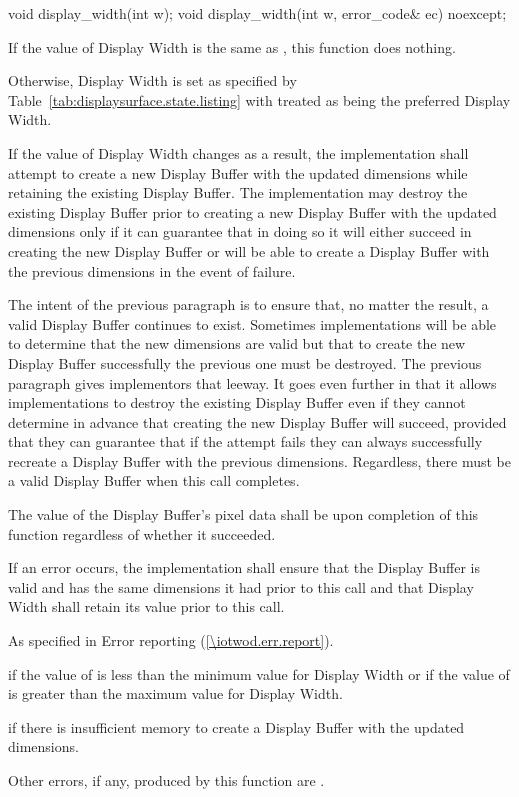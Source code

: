 \begin{itemdecl}
void display_width(int w);
void display_width(int w, error_code& ec) noexcept;
\end{itemdecl}
\begin{itemdescr}
\pnum
\effects
If the value of Display Width is the same as , this function does nothing.

\pnum
Otherwise, Display Width is set as specified by Table~\ref{tab:displaysurface.state.listing} with  treated as being the preferred Display Width.

\pnum
If the value of Display Width changes as a result, the implementation shall attempt to create a new Display Buffer with the updated dimensions while retaining the existing Display Buffer. The implementation may destroy the existing Display Buffer prior to creating a new Display Buffer with the updated dimensions only if it can guarantee that in doing so it will either succeed in creating the new Display Buffer or will be able to create a Display Buffer with the previous dimensions in the event of failure.

\pnum
\enternote
The intent of the previous paragraph is to ensure that, no matter the result, a valid Display Buffer continues to exist. Sometimes implementations will be able to determine that the new dimensions are valid but that to create the new Display Buffer successfully the previous one must be destroyed. The previous paragraph gives implementors that leeway. It goes even further in that it allows implementations to destroy the existing Display Buffer even if they cannot determine in advance that creating the new Display Buffer will succeed, provided that they can guarantee that if the attempt fails they can always successfully recreate a Display Buffer with the previous dimensions. Regardless, there must be a valid Display Buffer when this call completes.
\exitnote

\pnum
The value of the Display Buffer's pixel data shall be \unspecnorm upon completion of this function regardless of whether it succeeded.

\pnum
If an error occurs, the implementation shall ensure that the Display Buffer is valid and has the same dimensions it had prior to this call and that Display Width shall retain its value prior to this call.

\pnum
\throws
As specified in Error reporting (\ref{\iotwod.err.report}).

\pnum
\errors
{} if the value of  is less than the minimum value for Display Width or if the value of  is greater than the maximum value for Display Width.

 if there is insufficient memory to create a Display Buffer with the updated dimensions.

Other errors, if any, produced by this function are .
\end{itemdescr}

